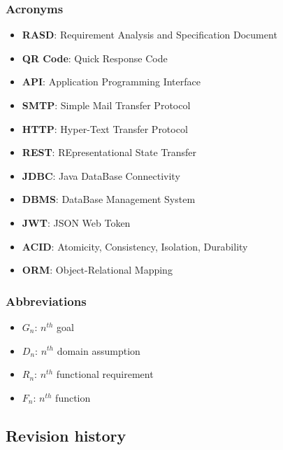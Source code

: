 \subsubsection{Acronyms}
\begin{itemize}
    \item \textbf{RASD}: Requirement Analysis and Specification Document
    \item \textbf{QR Code}: Quick Response Code
    \item \textbf{API}: Application Programming Interface
    \item \textbf{SMTP}: Simple Mail Transfer Protocol
    \item \textbf{HTTP}: Hyper-Text Transfer Protocol
    \item \textbf{REST}: REpresentational State Transfer
    \item \textbf{JDBC}: Java DataBase Connectivity
    \item \textbf{DBMS}: DataBase Management System
    \item \textbf{JWT}: JSON Web Token
    \item \textbf{ACID}: Atomicity, Consistency, Isolation, Durability
    \item \textbf{ORM}: Object-Relational Mapping
\end{itemize}
\subsubsection{Abbreviations}
\begin{itemize}
    \item \textbf{$G_n$}: $n^{th}$ goal
    \item \textbf{$D_n$}: $n^{th}$ domain assumption
    \item \textbf{$R_n$}: $n^{th}$ functional requirement
    \item \textbf{$F_n$}: $n^{th}$ function
\end{itemize}
\subsection{Revision history}

